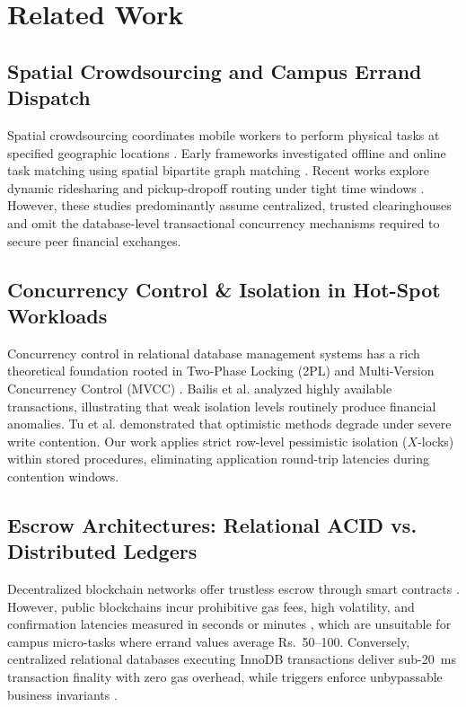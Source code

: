 \documentclass[conference]{IEEEtran}
\begin{document}
\section{Related Work}
\subsection{Spatial Crowdsourcing and Campus Errand Dispatch}
Spatial crowdsourcing coordinates mobile workers to perform physical tasks at specified geographic locations \cite{tong2020spatial}. Early frameworks investigated offline and online task matching using spatial bipartite graph matching \cite{kazemi2012geotruncation,deng2013maximizing}. Recent works explore dynamic ridesharing and pickup-dropoff routing under tight time windows \cite{chen2019ridesharing,zhao2022ridesharing}. However, these studies predominantly assume centralized, trusted clearinghouses and omit the database-level transactional concurrency mechanisms required to secure peer financial exchanges.

\subsection{Concurrency Control \& Isolation in Hot-Spot Workloads}
Concurrency control in relational database management systems has a rich theoretical foundation rooted in Two-Phase Locking (2PL) and Multi-Version Concurrency Control (MVCC) \cite{gray1992transaction,bernstein1987concurrency}. Bailis et al. \cite{bailis2014acid} analyzed highly available transactions, illustrating that weak isolation levels routinely produce financial anomalies. Tu et al. \cite{tu2013silo} demonstrated that optimistic methods degrade under severe write contention. Our work applies strict row-level pessimistic isolation ($X$-locks) within stored procedures, eliminating application round-trip latencies during contention windows.

\subsection{Escrow Architectures: Relational ACID vs. Distributed Ledgers}
Decentralized blockchain networks offer trustless escrow through smart contracts \cite{wood2014ethereum}. However, public blockchains incur prohibitive gas fees, high volatility, and confirmation latencies measured in seconds or minutes \cite{dinh2018untangling}, which are unsuitable for campus micro-tasks where errand values average Rs.~50--100. Conversely, centralized relational databases executing InnoDB transactions deliver sub-20~ms transaction finality with zero gas overhead, while triggers enforce unbypassable business invariants \cite{stonebraker1990rules}.
\end{document}

